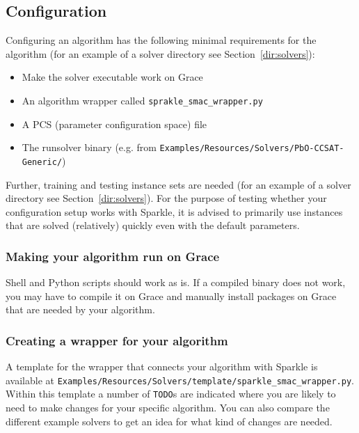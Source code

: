 \documentclass{article}
\begin{document}
\subsection{Configuration}
\label{quick:config_environment}

Configuring an algorithm has the following minimal requirements for the algorithm (for an example of a solver directory see Section~\ref{dir:solvers}):

\begin{itemize}
  \item[\ref{quick:solver_grace}] Make the solver executable work on Grace
  \item[\ref{quick:config_wrapper}] An algorithm wrapper called \texttt{sprakle\_smac\_wrapper.py}
  \item[\ref{quick:pcs_file}] A PCS (parameter configuration space) file
  \item The runsolver binary (e.g. from \texttt{Examples/Resources/Solvers/PbO-CCSAT-Generic/})
\end{itemize}

Further, training and testing instance sets are needed (for an example of a solver directory see Section~\ref{dir:solvers}). For the purpose of testing whether your configuration setup works with Sparkle, it is advised to primarily use instances that are solved (relatively) quickly even with the default parameters.

\subsubsection{Making your algorithm run on Grace}
\label{quick:solver_grace}

Shell and Python scripts should work as is. If a compiled binary does not work, you may have to compile it on Grace and manually install packages on Grace that are needed by your algorithm.

\subsubsection{Creating a wrapper for your algorithm}
\label{quick:config_wrapper}

A template for the wrapper that connects your algorithm with Sparkle is available at \texttt{Examples/Resources/Solvers/template/sparkle\_smac\_wrapper.py}. Within this template a number of \texttt{TODO}s are indicated where you are likely to need to make changes for your specific algorithm. You can also compare the different example solvers to get an idea for what kind of changes are needed.
\end{document}
